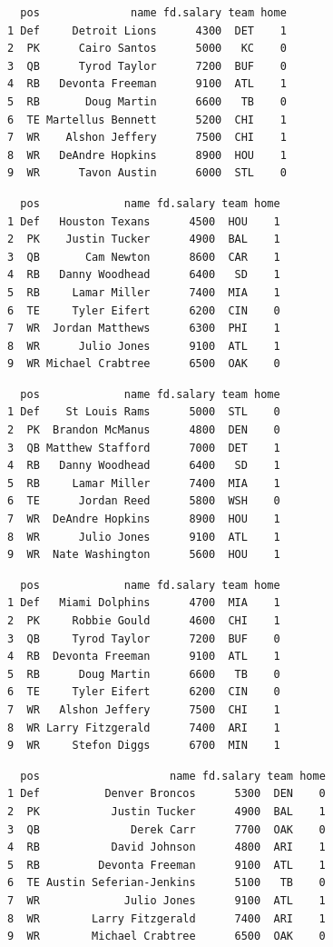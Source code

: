 \documentclass[10pt]{article}
\begin{document}
\begin{lstlisting}
  pos              name fd.salary team home
1 Def     Detroit Lions      4300  DET    1
2  PK      Cairo Santos      5000   KC    0
3  QB      Tyrod Taylor      7200  BUF    0
4  RB   Devonta Freeman      9100  ATL    1
5  RB       Doug Martin      6600   TB    0
6  TE Martellus Bennett      5200  CHI    1
7  WR    Alshon Jeffery      7500  CHI    1
8  WR   DeAndre Hopkins      8900  HOU    1
9  WR      Tavon Austin      6000  STL    0
\end{lstlisting}

\begin{lstlisting}
  pos             name fd.salary team home
1 Def   Houston Texans      4500  HOU    1
2  PK    Justin Tucker      4900  BAL    1
3  QB       Cam Newton      8600  CAR    1
4  RB   Danny Woodhead      6400   SD    1
5  RB     Lamar Miller      7400  MIA    1
6  TE     Tyler Eifert      6200  CIN    0
7  WR  Jordan Matthews      6300  PHI    1
8  WR      Julio Jones      9100  ATL    1
9  WR Michael Crabtree      6500  OAK    0
\end{lstlisting}

\begin{lstlisting}
  pos             name fd.salary team home
1 Def    St Louis Rams      5000  STL    0
2  PK  Brandon McManus      4800  DEN    0
3  QB Matthew Stafford      7000  DET    1
4  RB   Danny Woodhead      6400   SD    1
5  RB     Lamar Miller      7400  MIA    1
6  TE      Jordan Reed      5800  WSH    0
7  WR  DeAndre Hopkins      8900  HOU    1
8  WR      Julio Jones      9100  ATL    1
9  WR  Nate Washington      5600  HOU    1
\end{lstlisting}

\begin{lstlisting}
  pos             name fd.salary team home
1 Def   Miami Dolphins      4700  MIA    1
2  PK     Robbie Gould      4600  CHI    1
3  QB     Tyrod Taylor      7200  BUF    0
4  RB  Devonta Freeman      9100  ATL    1
5  RB      Doug Martin      6600   TB    0
6  TE     Tyler Eifert      6200  CIN    0
7  WR   Alshon Jeffery      7500  CHI    1
8  WR Larry Fitzgerald      7400  ARI    1
9  WR     Stefon Diggs      6700  MIN    1
\end{lstlisting}

\begin{lstlisting}
  pos                    name fd.salary team home
1 Def          Denver Broncos      5300  DEN    0
2  PK           Justin Tucker      4900  BAL    1
3  QB              Derek Carr      7700  OAK    0
4  RB           David Johnson      4800  ARI    1
5  RB         Devonta Freeman      9100  ATL    1
6  TE Austin Seferian-Jenkins      5100   TB    0
7  WR             Julio Jones      9100  ATL    1
8  WR        Larry Fitzgerald      7400  ARI    1
9  WR        Michael Crabtree      6500  OAK    0
\end{lstlisting}
\end{document}
